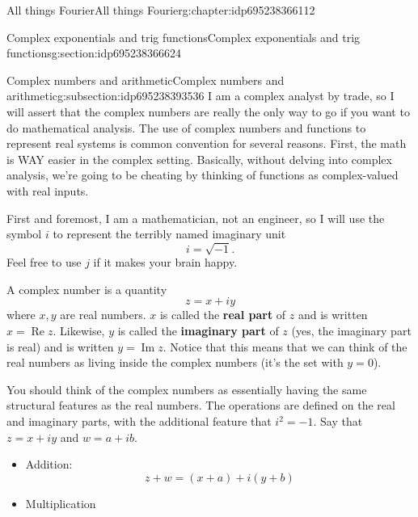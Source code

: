 \documentclass[oneside,10pt,]{book}
\newcommand{\terminology}[1]{\textbf{#1}}
\numberwithin{equation}{section}
\DeclareMathOperator{\RE}{Re}
\DeclareMathOperator{\IM}{Im}
\numberwithin{equation}{section}
\begin{document}
\begin{chapterptx}{All things Fourier}{}{All things Fourier}{}{}{g:chapter:idp695238366112}
\typeout{************************************************}
%
\begin{sectionptx}{Complex exponentials and trig functions}{}{Complex exponentials and trig functions}{}{}{g:section:idp695238366624}
%
%
\typeout{************************************************}
\typeout{************************************************}
%
\begin{subsectionptx}{Complex numbers and arithmetic}{}{Complex numbers and arithmetic}{}{}{g:subsection:idp695238393536}
I am a complex analyst by trade, so I will assert that the complex numbers are really the only way to go if you want to do mathematical analysis. The use of complex numbers and functions to represent real systems is common convention for several reasons. First, the math is WAY easier in the complex setting. Basically, without delving into complex analysis, we're going to be cheating by thinking of functions as complex-valued with real inputs.%
\par
First and foremost, I am a mathematician, not an engineer, so I will use the symbol \(i\) to represent the terribly named imaginary unit%
\begin{equation*}
i = \sqrt{-1}.
\end{equation*}
Feel free to use \(j\) if it makes your brain happy.%
\par
A complex number is a quantity%
\begin{equation*}
z = x + iy
\end{equation*}
where \(x, y\) are real numbers. \(x\) is called the \terminology{real part} of \(z\) and is written \(x = \RE z\). Likewise, \(y\) is called the \terminology{imaginary part} of \(z\) (yes, the imaginary part is real) and is written \(y = \IM z\). Notice that this means that we can think of the real numbers as living inside the complex numbers (it's the set with \(y = 0\)).%
\par
You should think of the complex numbers as essentially having the same structural features as the real numbers. The operations are defined on the real and imaginary parts, with the additional feature that \(i^2 = -1\). Say that \(z = x + iy\) and \(w = a + ib\).%
\begin{itemize}[label=\textbullet]
\item{}Addition:%
\begin{equation*}
z + w =  (x + a) + i(y + b)
\end{equation*}
%
\item{}Multiplication%

\end{itemize}
\end{subsectionptx}
\end{sectionptx}
\end{chapterptx}
\end{document}
